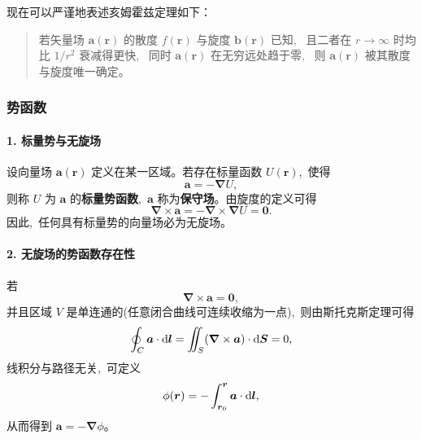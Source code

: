 现在可以严谨地表述亥姆霍兹定理如下：

\begin{quote}
若矢量场 $\boldsymbol a(\boldsymbol r)$ 的散度
$f(\boldsymbol r)$ 与旋度 $\boldsymbol b(\boldsymbol r)$ 已知, \,
且二者在 $r\to\infty$ 时均比 $1/r^2$ 衰减得更快, \,
同时 $\boldsymbol a(\boldsymbol r)$ 在无穷远处趋于零, \,
则 $\boldsymbol a(\boldsymbol r)$ 被其散度与旋度唯一确定。
\end{quote}

\subsubsection{势函数}

\paragraph{1. 标量势与无旋场}
设向量场 $\boldsymbol a(\boldsymbol r)$ 定义在某一区域。若存在标量函数 $U(\boldsymbol r)$, \,使得
\begin{equation}
    \boldsymbol a = -\boldsymbol{\nabla}U,
\end{equation}
则称 $U$ 为 $\boldsymbol a$ 的\textbf{标量势函数}, \,$\boldsymbol a$ 称为\textbf{保守场}。由旋度的定义可得
\begin{equation}
    \boldsymbol{\nabla}\times\boldsymbol a
    = -\boldsymbol{\nabla}\times\boldsymbol{\nabla}U
    = \boldsymbol 0.
\end{equation}
因此, \,任何具有标量势的向量场必为无旋场。

\paragraph{2. 无旋场的势函数存在性}
若
\begin{equation}
    \boldsymbol{\nabla}\times\boldsymbol a = \boldsymbol 0,
\end{equation}
并且区域 $V$ 是单连通的(任意闭合曲线可连续收缩为一点), \,则由斯托克斯定理可得
\begin{equation}
    \oint_C \boldsymbol a \cdot \dif \boldsymbol l
    = \iint_S (\boldsymbol{\nabla}\times\boldsymbol a) \cdot \dif \boldsymbol S
    = 0,
\end{equation}
线积分与路径无关, \,可定义
\begin{equation}
    \phi(\boldsymbol r)
    = -\int_{\boldsymbol r_0}^{\boldsymbol r} \boldsymbol a \cdot \dif \boldsymbol l,
\end{equation}
从而得到 $\boldsymbol a = -\boldsymbol{\nabla}\phi$。

